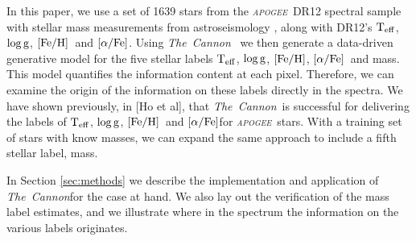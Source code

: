 \documentclass[12pt, preprint]{aastex}
\newcommand{\project}[1]{\textsl{#1}}
\newcommand{\tc}{\project{The~Cannon}}
\newcommand{\apogee}{\project{\textsc{apogee}}}
\newcommand{\teff}{\mbox{$\rm T_{eff}$}}
\newcommand{\feh}{\mbox{$\rm [Fe/H]$}}
\newcommand{\alphafe}{\mbox{$\rm [\alpha/Fe]$}}
\newcommand{\logg}{\mbox{$\rm \log g$}}
\begin{document}






In this paper, we use a set of 1639 stars from the \apogee\ DR12 spectral sample with stellar mass measurements from astroseismology \citep{P2014}, along with DR12's  \teff, \logg, \feh\ and \alphafe .  Using \tc~ \citep{Ness2015} we then generate a data-driven generative model for the five stellar labels \teff, \logg, \feh, \alphafe\ and mass. This model quantifies the information content at each pixel.  
Therefore, we can examine the origin of the information on these labels directly in the spectra. We have shown previously, in  \citet{Ness2015} [Ho et al],  that \tc\ is successful for delivering the labels of \teff, \logg, \feh\  and \alphafe for \apogee\ stars. With a training set of stars with know masses, we can expand the same approach to include a fifth stellar label, mass. 

In Section \ref{sec:methods} we describe the implementation and application of \tc for the case at hand. We also lay out the verification of the mass label estimates, and we illustrate where in the spectrum the information on the various labels originates. 
\end{document}

